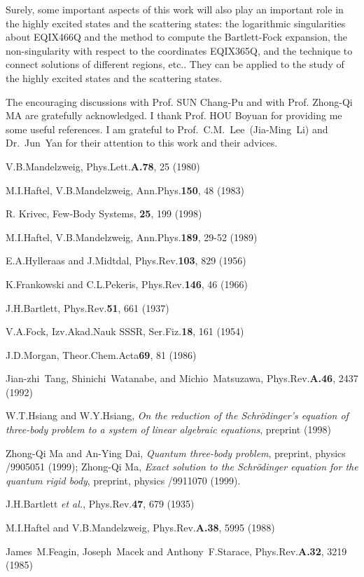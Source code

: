 Surely, some important aspects of this work will also play an important
role in the highly excited states and the scattering states: the logarithmic
singularities about EQIX466Q and the method to compute the Bartlett-Fock expansion,
the non-singularity with respect to the coordinates EQIX365Q, and the technique
to connect solutions of different regions, etc.. They can be applied
to the study of the highly excited states and the scattering states.

\vspace{5mm}

\noindent The encouraging discussions with Prof. SUN Chang-Pu and with
Prof. Zhong-Qi MA are gratefully
acknowledged. I thank Prof. HOU Boyuan for providing me some useful references.
I am grateful to Prof.~C.M.~Lee~(Jia-Ming~Li) and Dr.~Jun~Yan for
their attention to this work and their advices.

\begin{thebibliography}{99}

 V.B.Mandelzweig, Phys.Lett.{\bf A.78}, 25 (1980)

 M.I.Haftel, V.B.Mandelzweig, Ann.Phys.{\bf 150}, 48 (1983)

 R. Krivec, Few-Body Systems, {\bf 25}, 199 (1998)

 M.I.Haftel, V.B.Mandelzweig, Ann.Phys.{\bf 189}, 29-52 (1989)

 E.A.Hylleraas and J.Midtdal, Phys.Rev.{\bf 103}, 829 (1956)

 K.Frankowski and C.L.Pekeris, Phys.Rev.{\bf 146}, 46 (1966)

 J.H.Bartlett, Phys.Rev.{\bf 51}, 661 (1937)

 V.A.Fock, Izv.Akad.Nauk SSSR, Ser.Fiz.{\bf 18}, 161 (1954)

 J.D.Morgan, Theor.Chem.Acta{\bf 69}, 81 (1986)

 Jian-zhi~Tang, Shinichi~Watanabe, and Michio~Matsuzawa,
Phys.Rev.{\bf A.46}, 2437 (1992)

 W.T.Hsiang and W.Y.Hsiang, {\it On the reduction of the
Schr\"{o}dinger's equation of three-body problem to a system of linear
algebraic equations}, preprint (1998)

 Zhong-Qi Ma and An-Ying Dai, {\it Quantum three-body problem},
preprint, physics /9905051 (1999); Zhong-Qi Ma, {\it Exact solution to the
Schr\"{o}dinger equation for the quantum rigid body},
preprint, physics /9911070 (1999).

 J.H.Bartlett {\it et al.}, Phys.Rev.{\bf 47}, 679 (1935)

 M.I.Haftel and V.B.Mandelzweig, Phys.Rev.{\bf A.38}, 5995 (1988)

 James~M.Feagin, Joseph~Macek and Anthony~F.Starace,
Phys.Rev.{\bf A.32}, 3219 (1985)
\end{thebibliography}

